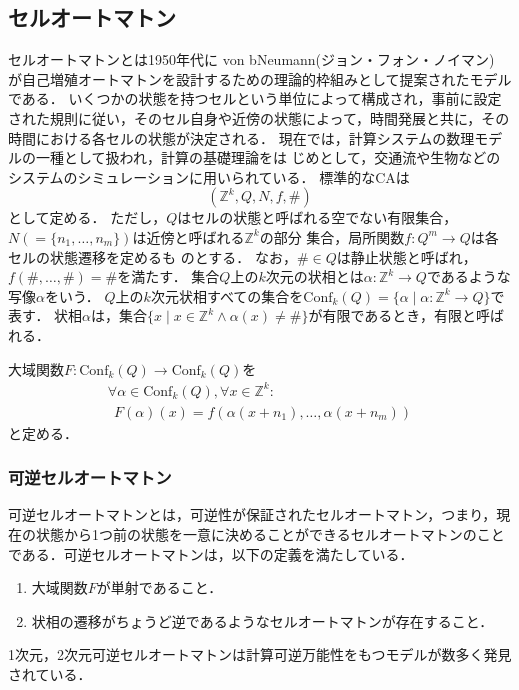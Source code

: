  \subsection{セルオートマトン}
セルオートマトンとは1950年代に von bNeumann(ジョン・フォン・ノイマン)　が自己増殖オートマトンを設計するための理論的枠組みとして提案されたモデルである．
いくつかの状態を持つセルという単位によって構成され，事前に設定された規則に従い，そのセル自身や近傍の状態によって，時間発展と共に，その時間における各セルの状態が決定される．
現在では，計算システムの数理モデルの一種として扱われ，計算の基礎理論をは
じめとして，交通流や生物などのシステムのシミュレーションに用いられている．
	標準的なCAは
	\[
 	(\mathbb{Z}^k,Q,N,f,\#)
	\]
	として定める．
	ただし，$Q$はセルの状態と呼ばれる空でない有限集合，
	$N(=\{n_{1},\ldots,n_{m}\})$は近傍と呼ばれる$\mathbb{Z}^k$の部分
	集合，局所関数$f:Q^m \rightarrow Q$は各セルの状態遷移を定めるも
	のとする．
	なお，$\#\in Q$は静止状態と呼ばれ，$f(\#,\ldots,\#)=\#$を満たす．
	集合$Q$上の$k$次元の状相とは$\alpha : \mathbb{Z}^k \rightarrow Q$であるような写像$\alpha$をいう．
	$Q$上の$k$次元状相すべての集合を$\mathrm{Conf}_k(Q)=\{\alpha \mid \alpha : \mathbb{Z}^k \rightarrow Q\}$で表す．
	状相$\alpha$は，集合$\{x\mid x\in \mathbb{Z}^k \wedge \alpha (x) \neq \#\}$が有限であるとき，有限と呼ばれる．\par
	大域関数$F: \mathrm{Conf}_k(Q) \rightarrow \mathrm{Conf}_k(Q)$を
	\begin{eqnarray}
 	\forall \alpha \in \mathrm{Conf}_k(Q),\forall x \in \mathbb{Z}^k: \hspace{60pt} \nonumber \\
	~~F(\alpha)(x) = f(\alpha(x+n_1),\ldots,\alpha(x+n_m))
	\end{eqnarray}
	と定める．

\subsubsection{可逆セルオートマトン}
可逆セルオートマトンとは，可逆性が保証されたセルオートマトン，つまり，現
在の状態から1つ前の状態を一意に決めることができるセルオートマトンのこと
である．可逆セルオートマトンは，以下の定義を満たしている．
\begin{enumerate}
\item 大域関数$F$が単射であること．
\item 状相の遷移がちょうど逆であるようなセルオートマトンが存在すること．
\end{enumerate}

1次元，2次元可逆セルオートマトンは計算可逆万能性をもつモデルが数多く発見されている．
